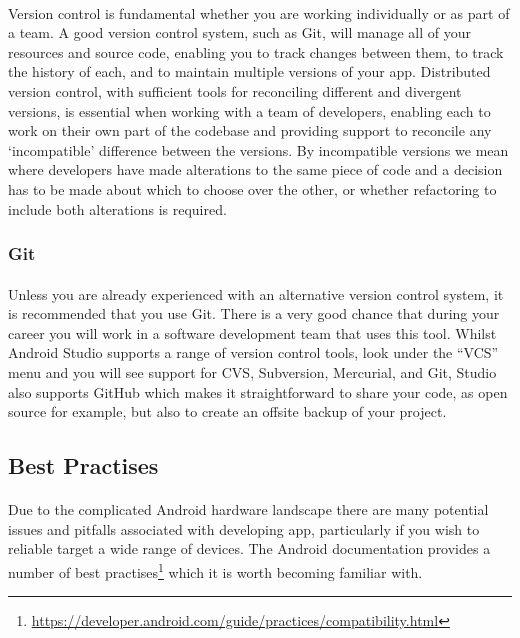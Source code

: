 \paragraph{} Version control is fundamental whether you are working individually or as part of a team. A good version control system, such as Git, will manage all of your resources and source code, enabling you to track changes between them, to track the history of each, and to maintain multiple versions of your app. Distributed version control, with sufficient tools for reconciling different and divergent versions, is essential when working with a team of developers, enabling each to work on their own part of the codebase and providing support to reconcile any `incompatible' difference between the versions. By incompatible versions we mean where developers have made alterations to the same piece of code and a decision has to be made about which to choose over the other, or whether refactoring to include both alterations is required. 

\subsubsection{Git}
\paragraph{} Unless you are already experienced with an alternative version control system, it is recommended that you use Git. There is a very good chance that during your career you will work in a software development team that uses this tool. Whilst Android Studio supports a range of version control tools, look under the ``VCS'' menu and you will see support for CVS, Subversion, Mercurial, and Git, Studio also supports GitHub which makes it straightforward to share your code, as open source for example, but also to create an offsite backup of your project.

\subsection{Best Practises}
\paragraph{} Due to the complicated Android hardware landscape there are many potential issues and pitfalls associated with developing app, particularly if you wish to reliable target a wide range of devices. The Android documentation provides a number of best practises\footnote{\url{https://developer.android.com/guide/practices/compatibility.html}} which it is worth becoming familiar with.


